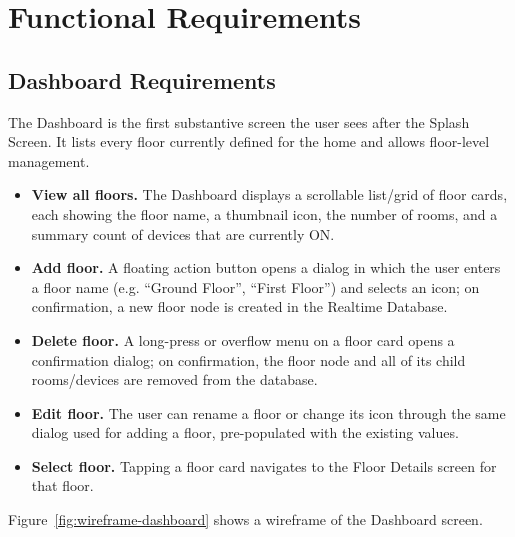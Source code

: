 \documentclass[11pt,a4paper]{article}
\begin{document}
\section{Functional Requirements}
\label{sec:functional}

\subsection{Dashboard Requirements}
The Dashboard is the first substantive screen the user sees after the Splash Screen. It lists every floor currently defined for the home and allows floor-level management.

\begin{itemize}
    \item \textbf{View all floors.} The Dashboard displays a scrollable list/grid of floor cards, each showing the floor name, a thumbnail icon, the number of rooms, and a summary count of devices that are currently ON.
    \item \textbf{Add floor.} A floating action button opens a dialog in which the user enters a floor name (e.g. ``Ground Floor'', ``First Floor'') and selects an icon; on confirmation, a new floor node is created in the Realtime Database.
    \item \textbf{Delete floor.} A long-press or overflow menu on a floor card opens a confirmation dialog; on confirmation, the floor node and all of its child rooms/devices are removed from the database.
    \item \textbf{Edit floor.} The user can rename a floor or change its icon through the same dialog used for adding a floor, pre-populated with the existing values.
    \item \textbf{Select floor.} Tapping a floor card navigates to the Floor Details screen for that floor.
\end{itemize}

Figure~\ref{fig:wireframe-dashboard} shows a wireframe of the Dashboard screen.
\end{document}
